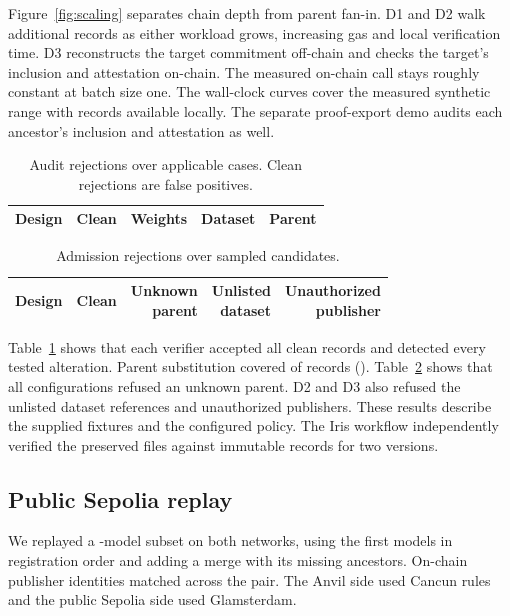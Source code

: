 Figure~\ref{fig:scaling} separates chain depth from parent fan-in.
D1 and D2 walk additional records as either workload grows, increasing
gas and local verification time. D3 reconstructs the target commitment
off-chain and checks the target's inclusion and attestation on-chain.
The measured on-chain call stays roughly constant at batch size one.
The wall-clock curves cover the measured synthetic range with records
available locally. The separate proof-export demo audits each ancestor's
inclusion and attestation as well.

\begin{table}[t]
\centering
\caption{Audit rejections over applicable cases. Clean rejections
are false positives.}
\label{tab:integrity}
\setlength{\tabcolsep}{3pt}
\begin{tabular}{lrrrr}
\toprule
Design & Clean & Weights & Dataset & Parent \\
\midrule

\end{tabular}
\end{table}

\begin{table}[t]
\centering
\caption{Admission rejections over sampled candidates.}
\label{tab:admission}
\setlength{\tabcolsep}{3pt}
\begin{tabular}{lrrrr}
\toprule
Design & Clean & \shortstack{Unknown\\parent} &
\shortstack{Unlisted\\dataset} & \shortstack{Unauthorized\\publisher} \\
\midrule

\end{tabular}
\end{table}

Table~\ref{tab:integrity} shows that each verifier accepted all clean
records and detected every tested alteration. Parent substitution covered
\ParentCaseCount{} of \AuditModelCount{} records (\ParentApplicability{}).
Table~\ref{tab:admission} shows that all configurations refused an unknown
parent. D2 and D3 also refused the unlisted dataset references and
unauthorized publishers. These results describe the supplied fixtures
and the configured policy. The Iris workflow independently verified the
preserved files against immutable records for two versions.


\subsection{Public Sepolia replay}
We replayed a \SepoliaModels-model subset on both networks, using the
first models in registration order and adding a merge with its missing
ancestors. On-chain publisher identities matched across the pair. The
Anvil side used Cancun rules and the public Sepolia side used Glamsterdam.

